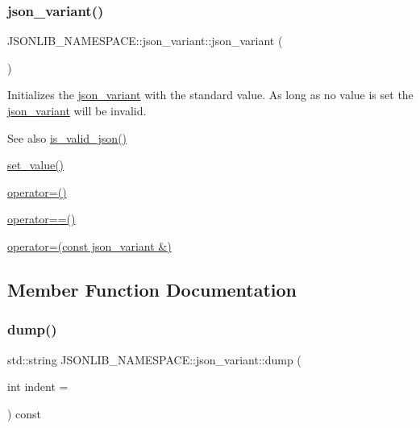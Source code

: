 \subsubsection{\texorpdfstring{json\+\_\+variant()}{json\_variant()}\hspace{0.1cm}{\footnotesize\ttfamily [2/2]}}
{\footnotesize\ttfamily J\+S\+O\+N\+L\+I\+B\+\_\+\+N\+A\+M\+E\+S\+P\+A\+C\+E\+::json\+\_\+variant\+::json\+\_\+variant (\begin{DoxyParamCaption}{ }\end{DoxyParamCaption})}



Initializes the \hyperlink{classJSONLIB__NAMESPACE_1_1json__variant}{json\+\_\+variant} with the standard value. As long as no value is set the \hyperlink{classJSONLIB__NAMESPACE_1_1json__variant}{json\+\_\+variant} will be invalid. 

\begin{DoxySeeAlso}{See also}
\hyperlink{classJSONLIB__NAMESPACE_1_1json__variant_a158e3148d9256af3d1b8251b2ca7b6c4}{is\+\_\+valid\+\_\+json()} 

\hyperlink{classJSONLIB__NAMESPACE_1_1json__variant_a0cfce194bda4d31ad37d765a6428974a}{set\+\_\+value()} 

\hyperlink{classJSONLIB__NAMESPACE_1_1json__variant_acab384801617885ba1dc3b965a456e7e}{operator=()} 

\hyperlink{classJSONLIB__NAMESPACE_1_1json__variant_aef1fc1a342cc170da06e0d3eb1299aad}{operator==()} 

\hyperlink{classJSONLIB__NAMESPACE_1_1json__variant_acab384801617885ba1dc3b965a456e7e}{operator=(const json\+\_\+variant \&)} 
\end{DoxySeeAlso}


\subsection{Member Function Documentation}
\mbox{\label{classJSONLIB__NAMESPACE_1_1json__variant_a72d4a39d77b76f076354219edc6ea4a0}} 
\subsubsection{\texorpdfstring{dump()}{dump()}\hspace{0.1cm}{\footnotesize\ttfamily [1/2]}}
{\footnotesize\ttfamily std\+::string J\+S\+O\+N\+L\+I\+B\+\_\+\+N\+A\+M\+E\+S\+P\+A\+C\+E\+::json\+\_\+variant\+::dump (\begin{DoxyParamCaption}\item[{int}]{indent = {} }\end{DoxyParamCaption}) const}



